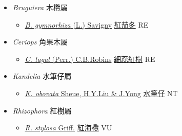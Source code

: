 
  \begin{itemize}
 \item[] \textit{Bruguiera} 木欖屬
                    
  \begin{itemize}
        \item[] \href{http://www.theplantlist.org/tpl1.1/search?q=Bruguiera+gymnorhiza}{\textit{B. gymnorhiza} (L.) Savigny}   \href{\detokenize{http://taibnet.sinica.edu.tw/chi/taibnet_species_list.php?T2=紅茄冬&T2_new_value=true&fr=y}}{紅茄冬} RE
  \end{itemize}
 \item[] \textit{Ceriops} 角果木屬
                    
  \begin{itemize}
        \item[] \href{http://www.theplantlist.org/tpl1.1/search?q=Ceriops+tagal}{\textit{C. tagal} (Perr.) C.B.Robins}   \href{\detokenize{http://taibnet.sinica.edu.tw/chi/taibnet_species_list.php?T2=細蕊紅樹&T2_new_value=true&fr=y}}{細蕊紅樹} RE
  \end{itemize}
 \item[] \textit{Kandelia} 水筆仔屬
                    
  \begin{itemize}
        \item[] \href{http://www.theplantlist.org/tpl1.1/search?q=Kandelia+obovata}{\textit{K. obovata} Sheue, H.Y.Liu \& J.Yong}   \href{\detokenize{http://taibnet.sinica.edu.tw/chi/taibnet_species_list.php?T2=水筆仔&T2_new_value=true&fr=y}}{水筆仔} NT
  \end{itemize}
 \item[] \textit{Rhizophora} 紅樹屬
                    
  \begin{itemize}
        \item[] \href{http://www.theplantlist.org/tpl1.1/search?q=Rhizophora+stylosa}{\textit{R. stylosa} Griff.}   \href{\detokenize{http://taibnet.sinica.edu.tw/chi/taibnet_species_list.php?T2=紅海欖&T2_new_value=true&fr=y}}{紅海欖} VU
  \end{itemize}
  \end{itemize}
